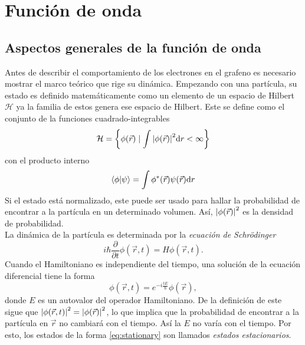 \section{Función de onda}
\subsection{Aspectos generales de la función de onda}
Antes de describir el comportamiento de los electrones en el grafeno es necesario mostrar el marco teórico que rige su dinámica. Empezando con una partícula, su estado es definido matemáticamente como un elemento de un espacio de Hilbert $\mathcal{H}$ ya la familia de estos genera ese espacio de Hilbert. Este se define como el conjunto de la funciones cuadrado-integrables
\begin{equation}
	\mathcal{H} = \left\{\phi(\vec{r}) \mid \int \abs{\phi(\vec{r})}^2 \dd r < \infty\right\}
\end{equation}
con el producto interno
\begin{equation}
	\braket{\phi}{\psi} = \int \phi^{\ast}(\vec{r})\psi(\vec{r}) \dd r
\end{equation}
Si el estado está normalizado, este puede ser usado para hallar la probabilidad de encontrar a la partícula en un determinado volumen. Así, $\abs{\phi(\vec{r})}^2$ es la densidad de probabilidad.\\
La dinámica de la partícula es determinada por la \emph{ecuación de Schrödinger}
\begin{equation}
	i\hbar \frac{\partial }{\partial t}\phi(\vec{r},t) = H \phi(\vec{r},t).
\end{equation}
Cuando el Hamiltoniano es independiente del tiempo, una solución de la ecuación diferencial tiene la forma
\begin{equation}
	\phi(\vec{r},t) = e^{-i \frac{tE}{\hbar}}\phi(\vec{r}),\label{eq:stationary}
\end{equation}
donde $E$ es un autovalor del operador Hamiltoniano. De la definición de este sigue que $\abs{\phi(\vec{r}, t)}^2 = \abs{\phi(\vec{r})}^2$, lo que implica que la probabilidad de encontrar a la partícula en $\vec{r}$ no cambiará con el tiempo. Así la $E$ no varía con el tiempo. Por esto, los estados de la forma \eqref{eq:stationary} son llamados \emph{estados estacionarios}.\par
